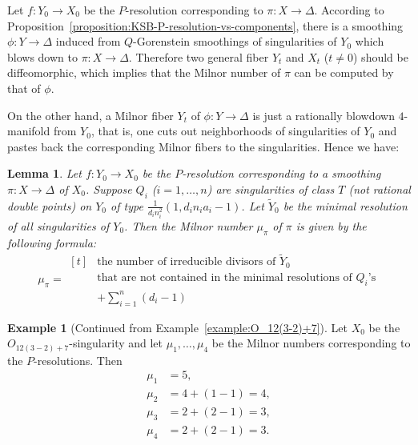 \documentclass[reqno, twoside, a4paper]{amsart}
\newtheorem{lemma}[theorem]{Lemma}
\theoremstyle{definition}
\newtheorem{example}[theorem]{Example}
\numberwithin{equation}{section}
\begin{document}
Let $f \colon Y_0 \to X_0$ be the $P$-resolution corresponding to $\pi \colon X \to \Delta$. According to Proposition~\ref{proposition:KSB-P-resolution-vs-components}, there is a smoothing $\phi \colon Y \to \Delta$ induced from $Q$-Gorenstein smoothings of singularities of $Y_0$ which blows down to $\pi \colon X \to \Delta$. Therefore two general fiber $Y_t$ and $X_t$ ($t \neq 0$) should be diffeomorphic, which implies that the Milnor number of $\pi$ can be computed by that of $\phi$.

On the other hand, a Milnor fiber $Y_t$ of $\phi \colon Y \to \Delta$ is just a rationally blowdown $4$-manifold from $Y_0$, that is, one cuts out neighborhoods of singularities of $Y_0$ and pastes back the corresponding Milnor fibers to the singularities. Hence we have:

\begin{lemma}
Let $f \colon Y_0 \to X_0$ be the $P$-resolution corresponding to a smoothing $\pi \colon X \to \Delta$ of $X_0$. Suppose $Q_i$ ($i=1,\dotsc,n$) are singularities of class $T$ (not rational double points) on $Y_0$ of type $\frac{1}{d_i n_i^2}(1,d_in_ia_i-1)$. Let $\widetilde{Y}_0$ be the minimal resolution of all singularities of $Y_0$. Then the Milnor number $\mu_{\pi}$ of $\pi$ is given by the following formula:
%
\begin{equation*}
\mu_{\pi} =
\begin{aligned}[t]
&\text{the number of irreducible divisors of $\widetilde{Y}_0$}\\
&\text{that are not contained in the minimal resolutions of $Q_i$'s}\\
&+ \sum_{i=1}^{n} (d_i-1)
\end{aligned}
\end{equation*}
\end{lemma}

\begin{example}[Continued from Example~\ref{example:O_12(3-2)+7}]
Let $X_0$ be the $O_{12(3-2)+7}$-singularity and let $\mu_1, \dotsc, \mu_4$ be the Milnor numbers corresponding to the $P$-resolutions. Then
%
\begin{align*}
\mu_1 &= 5, \\
\mu_2 &= 4 + (1-1) = 4, \\
\mu_3 &= 2 + (2-1) = 3, \\
\mu_4 &= 2 + (2-1) = 3.
\end{align*}
\end{example}
\end{document}

